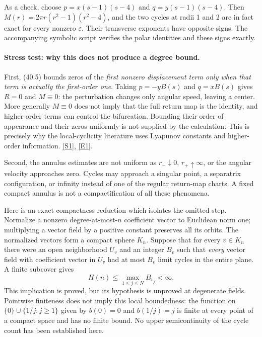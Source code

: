 \documentclass[11pt,a4paper]{article}
\newcommand{\sref}[2]{\hyperlink{source:#1:#2}{[S#2]}}
\newcommand{\eref}[2]{\hyperlink{extra:#1:#2}{[E#2]}}
\numberwithin{equation}{section}
\begin{document}
As a check, choose $p=x(s-1)(s-4)$ and $q=y(s-1)(s-4)$.
Then $M(r)=2\pi r(r^2-1)(r^2-4)$, and the two cycles at radii
1 and 2 are in fact exact for every nonzero $\varepsilon$. Their transverse
exponents have opposite signs. The accompanying symbolic script verifies
the polar identities and these signs exactly.

\paragraph{Stress test: why this does not produce a degree bound.}
First, (40.5) bounds zeros of the \emph{first nonzero displacement term
only when that term is actually the first-order one}. Taking
$p=-yB(s)$ and $q=xB(s)$ gives $R=0$ and $M\equiv0$: the perturbation
changes only angular speed, leaving a center. More generally $M\equiv0$
does not imply that the full return map is the identity, and higher-order
terms can control the bifurcation. Bounding their order of appearance and
their zeros uniformly is not supplied by the calculation. This is precisely
why the local-cyclicity literature uses Lyapunov constants and higher-order
information. \sref{statement}{1}, \eref{statement}{1}.

Second, the annulus estimates are not uniform as $r_-\downarrow0$,
$r_+\uparrow\infty$, or the angular velocity approaches zero. Cycles may
approach a singular point, a separatrix configuration, or infinity instead
of one of the regular return-map charts. A fixed compact annulus is not a
compactification of all these phenomena.

Here is an exact compactness reduction which isolates the omitted step.
Normalize a nonzero degree-at-most-$n$ coefficient vector to Euclidean norm
one; multiplying a vector field by a positive constant preserves all its
orbits. The normalized vectors form a compact sphere $K_n$. Suppose that
for every $v\in K_n$ there were an open neighborhood $U_v$ and an integer
$B_v$ such that \emph{every} vector field with coefficient vector in $U_v$
had at most $B_v$ limit cycles in the entire plane. A finite subcover gives
\[
 H(n)\le\max_{1\le j\le N}B_{v_j}<\infty.           \tag{40.6}
\]
This implication is proved, but its hypothesis is unproved at degenerate
fields. Pointwise finiteness does not imply this local boundedness: the
function on $\{0\}\cup\{1/j:j\ge1\}$ given by $b(0)=0$ and $b(1/j)=j$
is finite at every point of a compact space and has no finite bound.
No upper semicontinuity of the cycle count has been established here.
\end{document}
